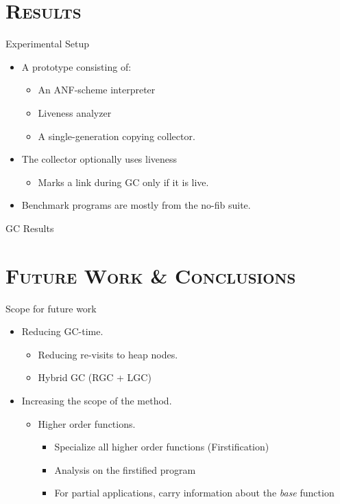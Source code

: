 \documentclass[xcolor=x11names,compress,mathserif]{beamer}
\renewcommand{\(}{\begin{columns}}
\renewcommand{\)}{\end{columns}}
\newcommand{\<}[1]{\begin{column}{#1}}
\renewcommand{\>}{\end{column}}
\begin{document}
\section{\scshape Results}
\begin{frame}{Experimental Setup}
  \begin{itemize}\itemsep1em
  \item A prototype consisting of:
    \begin{itemize}
    \item An ANF-scheme interpreter
    \item Liveness analyzer
    \item A single-generation copying collector.
     \end{itemize}
  \item The collector optionally uses liveness
    \begin{itemize}
    \item Marks a link during GC only if it is live.
    \end{itemize}
  \item Benchmark programs are mostly from the no-fib suite. 
  \end{itemize}

\end{frame}

\begin{frame}[t]{GC Results}
  
\end{frame}
\section{\scshape Future Work  \& Conclusions} 
\begin{frame}{Scope for future work}
\normalsize
\begin{itemize}\itemsep2em
\item<1-> Reducing GC-time.
  \begin{itemize}
  \item Reducing re-visits to heap nodes.
  \item Hybrid GC (RGC + LGC)
  \end{itemize}
\item<2-> Increasing the scope of the method.
  \begin{itemize}
   \item Higher order functions.
    \begin{itemize}
    \item Specialize all higher order functions (Firstification)
    \item Analysis on the firstified program 
    \item For partial applications, carry information about the {\em base} function
    \end{itemize}
  \end{itemize}
\end{itemize}
\end{frame}
\end{document}
